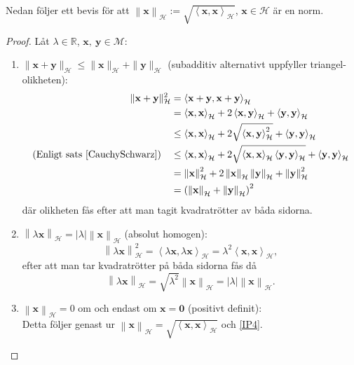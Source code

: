 \documentclass[a4paper, 12pt]{report}
\theoremstyle{definition}
\theoremstyle{remark}
\newcommand{\bfx}{\mathbf{x}}
\newcommand{\llangle}{\left\langle}
\newcommand{\rrangle}{\right\rangle}
\begin{document}
Nedan följer ett bevis för att $\left\| \bfx \right\|_\mathcal{H} := \sqrt{\llangle \bfx , \bfx \rrangle_\mathcal{H}}$, $\bfx \in\mathcal{H}$ är en norm.
\begin{proof}
	Låt $\lambda \in \mathbb{R}$, $\bfx,~\mathbf{y}\in \mathcal{M}$:
	\begin{enumerate}[label=\textbf{N\arabic*}]
		\item $\| \bfx + \mathbf{y}\|_\mathcal{H} \leq \| \bfx \|_\mathcal{H} + \| \mathbf{y}\|_\mathcal{H}$ (subadditiv alternativt uppfyller triangel-olikheten): 
		\begin{align*}
			\| \bfx + \mathbf{y}\|_\mathcal{H}^2 &= \llangle \bfx + \mathbf{y}, \bfx + \mathbf{y}\rrangle_\mathcal{H}\\
			&= \llangle \bfx, \bfx \rrangle_\mathcal{H} + 2 \llangle \bfx, \mathbf{y}\rrangle_\mathcal{H} + \llangle \mathbf{y}, \mathbf{y} \rrangle_\mathcal{H}\\
			&\leq \llangle \bfx, \bfx \rrangle_\mathcal{H} + 2\sqrt{\llangle \bfx, \mathbf{y}\rrangle^2_\mathcal{H}} + \llangle \mathbf{y}, \mathbf{y} \rrangle_\mathcal{H}\\
			\text{(Enligt sats \ref{CauchySchwarz})}\quad&\leq \llangle \bfx, \bfx \rrangle_\mathcal{H} + 2\sqrt{\llangle \bfx, \bfx\rrangle_ \mathcal{H} \llangle \mathbf{y}, \mathbf{y} \rrangle_\mathcal{H}} + \llangle \mathbf{y}, \mathbf{y} \rrangle_\mathcal{H}\\
			&=\left\|\bfx \right\|^2_\mathcal{H} + 2\left\|\bfx \right\|_\mathcal{H}\left\|\mathbf{y} \right\|_\mathcal{H}  + \left\| \mathbf{y}\right\|^2_\mathcal{H}\\
			&= \left(\left\|\bfx \right\|_\mathcal{H}+ \left\| \mathbf{y}\right\|_\mathcal{H}\right)^2
		\end{align*}
		där olikheten fås efter att man tagit kvadratrötter av båda sidorna.
		\item $\left\| \lambda\bfx \right\|_\mathcal{H} = \left|\lambda\right|\left\| \bfx \right\|_\mathcal{H}$ (absolut homogen):
		\begin{equation*}
			\left\| \lambda\bfx \right\|_\mathcal{H}^2 = \llangle \lambda \bfx, \lambda \bfx \rrangle_\mathcal{H}
			= \lambda^2 \llangle \bfx, \bfx \rrangle_\mathcal{H},
		\end{equation*}
		efter att man tar kvadratrötter på båda sidorna fås då
		\begin{equation*}
			\left\| \lambda\bfx \right\|_\mathcal{H} = \sqrt{\lambda^2}\left\| \bfx \right\|_\mathcal{H} = \left|\lambda\right| \left\| \bfx \right\|_\mathcal{H}.
		\end{equation*}
		\item $\left\| \bfx \right\|_\mathcal{H}=0$ om och endast om $\bfx = \mathbf{0}$ (positivt definit):\\
		Detta följer genast ur $\left\| \bfx \right\|_\mathcal{H} = \sqrt{\llangle \bfx, \bfx \rrangle_\mathcal{H}}$ och \ref{IP4}. \qedhere
	\end{enumerate}
\end{proof}
\end{document}
